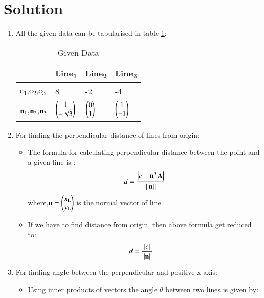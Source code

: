 \documentclass[journal,12pt,twocolumn]{IEEEtran}
\begin{document}
\section{Solution}
\begin{enumerate}
\item  All the given data can be tabularised in table \ref{tab:table1}:
\begin{table}[!ht]
\begin{center}
\begin{tabular}{ | m{2cm} | m{1.2cm}| m{1.2cm} | m{1.2cm} |} 
\hline
 & Line\textsubscript{1} & Line\textsubscript{2} & Line\textsubscript{3} \\
\hline
c\textsubscript{1},c\textsubscript{2},c\textsubscript{3} & 8 & -2 & -4 \\ 
\hline
$\vec{n\textsubscript{1}}$,$\vec{n\textsubscript{2}}$,$\vec{n\textsubscript{3}}$ & $\myvec{1\\-\sqrt{3}}$ & $\myvec{0\\1}$ &$\myvec{1\\-1}$ \\ 
\hline
\end{tabular}
\end{center}
\caption{Given Data}
\label{tab:table1}
\end{table}
\item For finding the perpendicular distance of lines from origin:-
\begin{itemize}
\item The formula for calculating perpendicular distance between the point and a given line is :
\begin{align}
d=\frac { \left| c-\vec{n}^T\vec{A} \right| }{ \norm{\vec{n}} }
\end{align}
where,$\vec{n}=\myvec{x\textsubscript{L}\\y\textsubscript{L}}$ is the normal vector of line.
\item If we have to find distance from origin, then above formula get reduced to:
\begin{align}
d&=\frac { \left| c \right| }{\norm{\vec{n}}}\label{eqA}
\end{align}
\end{itemize}
\item For finding angle between the perpendicular and positive x-axis:-
\begin{itemize}
\item Using inner products of vectors the angle $\theta$ between two lines is given by:
\begin{align}

\end{align}
\end{itemize}
\end{enumerate}
\end{document}

